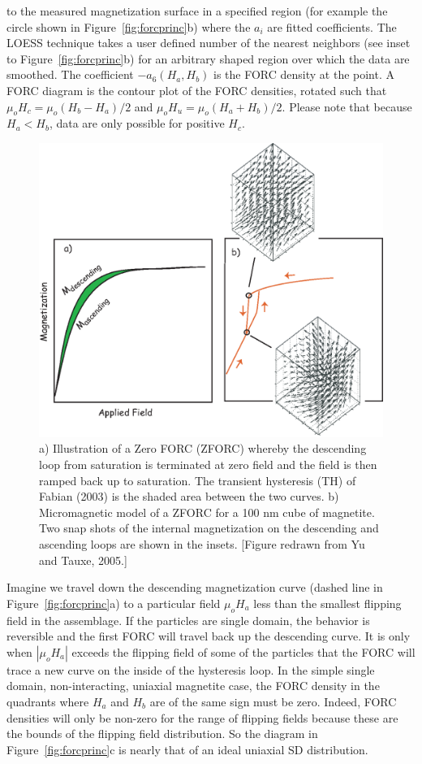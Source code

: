 \noindent  to the measured magnetization surface in a specified region (for example the circle shown in Figure~\ref{fig:forcprinc}b) where the $a_i$ are fitted coefficients.     The LOESS technique takes a user defined number of  the nearest neighbors (see inset to Figure~\ref{fig:forcprinc}b) for an arbitrary shaped region over which the data are smoothed.    
The coefficient $-a_6(H_a,H_b)$ is  the FORC density at the point.    A FORC diagram is the contour plot  of the FORC densities, rotated such that $\mu_oH_c = \mu_o(H_b-H_a)/2$ and $\mu_oH_u = \mu_o(H_a+H_b)/2$.    Please note that because $H_a<H_b$, data are only possible for positive $H_c$.  
 

\begin{figure}[htb]
\centering  \includegraphics[width=10 cm]{EPSfiles/ZFORC.eps}
\caption{a) Illustration of a Zero FORC (ZFORC) whereby the descending loop from saturation is terminated at zero field and the field is then ramped back up to saturation.  The  transient hysteresis (TH) of 
Fabian (2003) is the shaded area between the two curves.  b) Micromagnetic model of a ZFORC for a 100 nm cube of magnetite.  Two snap shots of the internal magnetization on the descending and ascending loops are shown in the insets.  [Figure redrawn from Yu and Tauxe, 2005.] }
\label{fig:ZFORC}
\end{figure}
\nocite{yu05b}
\nocite{fabian03} 

 Imagine we travel down the descending magnetization curve (dashed line in Figure~\ref{fig:forcprinc}a) to a particular field $\mu_o H_a $ less than the smallest flipping field in the assemblage.   If the particles are single domain, the behavior is reversible and the first  FORC will travel back up the descending curve.  It is only when $|\mu_o H_a|$ exceeds the flipping field of some of the particles that the FORC will trace a new curve on the inside of the hysteresis loop.  In the simple single domain, non-interacting,  uniaxial magnetite case, the FORC density in the quadrants where $H_a$ and $H_b$ are of the same sign must be zero. Indeed, FORC densities will only be non-zero for the range of flipping fields  because these are the bounds of the flipping field distribution.      So the diagram in Figure~\ref{fig:forcprinc}c is nearly that of an ideal uniaxial SD distribution.  
 
